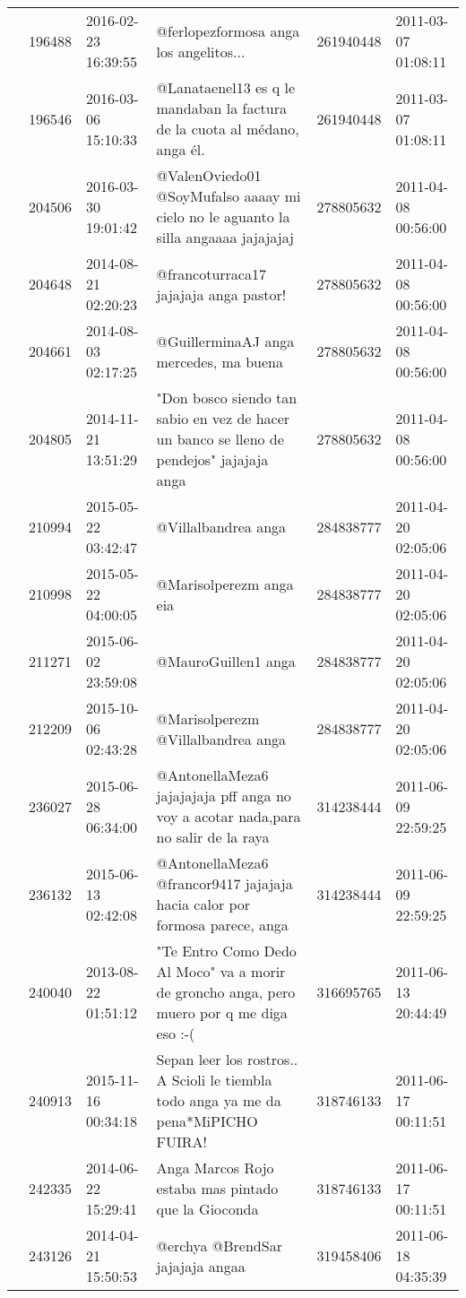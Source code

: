 \begin{tabular}{llllrl}
 & 196488& 2016-02-23 16:39:55 & @ferlopezformosa anga los angelitos... & 261940448 & 2011-03-07 01:08:11 \\
 & 196546& 2016-03-06 15:10:33 &@Lanataenel13 es q le mandaban la factura de la cuota al médano, anga él. & 261940448 & 2011-03-07 01:08:11 \\
 & 204506& 2016-03-30 19:01:42 & @ValenOviedo01 @SoyMufalso aaaay mi cielo no le aguanto la silla angaaaa jajajajaj & 278805632 & 2011-04-08 00:56:00 \\
 & 204648& 2014-08-21 02:20:23 & @francoturraca17 jajajaja anga pastor! & 278805632 & 2011-04-08 00:56:00 \\
 & 204661& 2014-08-03 02:17:25 & @GuillerminaAJ anga mercedes, ma buena & 278805632 & 2011-04-08 00:56:00 \\
 & 204805& 2014-11-21 13:51:29 & "Don bosco siendo tan sabio en vez de hacer un banco se lleno de pendejos" jajajaja anga & 278805632 & 2011-04-08 00:56:00 \\
 & 210994& 2015-05-22 03:42:47 &@Villalbandrea anga & 284838777 & 2011-04-20 02:05:06 \\
 & 210998& 2015-05-22 04:00:05 &@Marisolperezm anga eia & 284838777 & 2011-04-20 02:05:06 \\
 & 211271& 2015-06-02 23:59:08 &@MauroGuillen1 anga & 284838777 & 2011-04-20 02:05:06 \\
 & 212209& 2015-10-06 02:43:28 & @Marisolperezm @Villalbandrea anga & 284838777 & 2011-04-20 02:05:06 \\
 & 236027& 2015-06-28 06:34:00 &@AntonellaMeza6 jajajajaja pff anga no voy a acotar nada,para no salir de la raya & 314238444 & 2011-06-09 22:59:25 \\
 & 236132& 2015-06-13 02:42:08 & @AntonellaMeza6 @francor9417 jajajaja hacia calor por formosa parece, anga & 314238444 & 2011-06-09 22:59:25 \\
 & 240040& 2013-08-22 01:51:12 &"Te Entro Como Dedo Al Moco" va a morir de groncho anga, pero muero por q me diga eso :-( & 316695765 & 2011-06-13 20:44:49 \\
 & 240913& 2015-11-16 00:34:18 &Sepan leer los rostros.. A Scioli le tiembla todo anga ya me da pena*MiPICHO FUIRA! & 318746133 & 2011-06-17 00:11:51 \\
 & 242335& 2014-06-22 15:29:41 &Anga Marcos Rojo estaba mas pintado que la Gioconda & 318746133 & 2011-06-17 00:11:51 \\
 & 243126& 2014-04-21 15:50:53 & @erchya @BrendSar jajajaja angaa & 319458406 & 2011-06-18 04:35:39 \\

\end{tabular}
